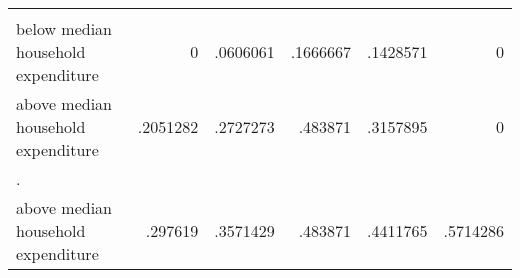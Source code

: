 \begin{table}[!h]
\begin{tabular}{llllll}
  \multicolumn{1}{|r}{} &
  \multicolumn{1}{r}{} &
  \multicolumn{1}{r}{} &
  \multicolumn{1}{r}{} &
  \multicolumn{1}{r}{} \\
\multicolumn{1}{l}{\hspace{1em}below median household expenditure} &
  \multicolumn{1}{|r}{0} &
  \multicolumn{1}{r}{.0606061} &
  \multicolumn{1}{r}{.1666667} &
  \multicolumn{1}{r}{.1428571} &
  \multicolumn{1}{r}{0} \\
\multicolumn{1}{l}{\hspace{1em}above median household expenditure} &
  \multicolumn{1}{|r}{.2051282} &
  \multicolumn{1}{r}{.2727273} &
  \multicolumn{1}{r}{.483871} &
  \multicolumn{1}{r}{.3157895} &
  \multicolumn{1}{r}{0} \\
\multicolumn{1}{l}{.} &
  \multicolumn{1}{|r}{} &
  \multicolumn{1}{r}{} &
  \multicolumn{1}{r}{} &
  \multicolumn{1}{r}{} &
  \multicolumn{1}{r}{} \\
\multicolumn{1}{l}{\hspace{1em}above median household expenditure} &
  \multicolumn{1}{|r}{.297619} &
  \multicolumn{1}{r}{.3571429} &
  \multicolumn{1}{r}{.483871} &
  \multicolumn{1}{r}{.4411765} &
  \multicolumn{1}{r}{.5714286} \\
\cline{1-6}
\end{tabular}
\end{table}
